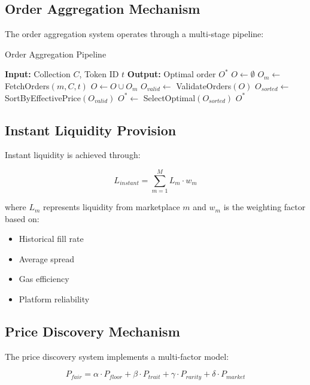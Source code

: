 \documentclass[11pt,a4paper]{article}
\begin{document}
\subsection{Order Aggregation Mechanism}

The order aggregation system operates through a multi-stage pipeline:

\begin{algorithm}
\caption{Order Aggregation Pipeline}
\begin{algorithmic}
\STATE \textbf{Input:} Collection $C$, Token ID $t$
\STATE \textbf{Output:} Optimal order $O^*$
\STATE
\STATE $O \leftarrow \emptyset$ 
    \STATE $O_m \leftarrow$ FetchOrders$(m, C, t)$
    \STATE $O \leftarrow O \cup O_m$
\ENDFOR
\STATE
\STATE $O_{valid} \leftarrow$ ValidateOrders$(O)$
\STATE $O_{sorted} \leftarrow$ SortByEffectivePrice$(O_{valid})$
\STATE $O^* \leftarrow$ SelectOptimal$(O_{sorted})$
\RETURN $O^*$
\end{algorithmic}
\end{algorithm}

\subsection{Instant Liquidity Provision}

Instant liquidity is achieved through:

\begin{equation}
L_{instant} = \sum_{m=1}^{M} L_m \cdot w_m
\end{equation}

where $L_m$ represents liquidity from marketplace $m$ and $w_m$ is the weighting factor based on:
\begin{itemize}
\item Historical fill rate
\item Average spread
\item Gas efficiency
\item Platform reliability
\end{itemize}

\subsection{Price Discovery Mechanism}

The price discovery system implements a multi-factor model:

\begin{equation}
P_{fair} = \alpha \cdot P_{floor} + \beta \cdot P_{trait} + \gamma \cdot P_{rarity} + \delta \cdot P_{market}
\end{equation}
\end{document}
